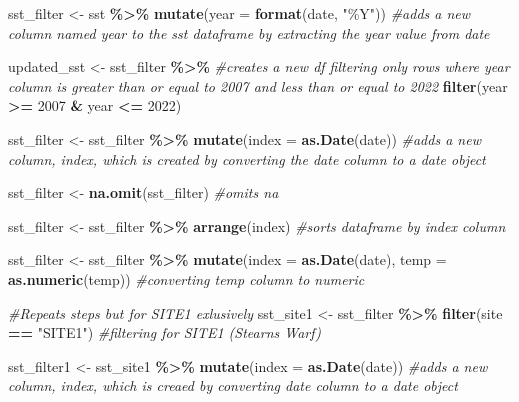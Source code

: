 \documentclass[
]{article}
\newenvironment{Shaded}{\begin{snugshade}}{\end{snugshade}}
\newcommand{\AttributeTok}[1]{\textcolor[rgb]{0.13,0.29,0.53}{#1}}
\newcommand{\CommentTok}[1]{\textcolor[rgb]{0.56,0.35,0.01}{\textit{#1}}}
\newcommand{\DecValTok}[1]{\textcolor[rgb]{0.00,0.00,0.81}{#1}}
\newcommand{\FunctionTok}[1]{\textcolor[rgb]{0.13,0.29,0.53}{\textbf{#1}}}
\newcommand{\NormalTok}[1]{#1}
\newcommand{\OtherTok}[1]{\textcolor[rgb]{0.56,0.35,0.01}{#1}}
\newcommand{\SpecialCharTok}[1]{\textcolor[rgb]{0.81,0.36,0.00}{\textbf{#1}}}
\newcommand{\StringTok}[1]{\textcolor[rgb]{0.31,0.60,0.02}{#1}}
\begin{document}
\begin{Shaded}
\begin{Highlighting}[]
\NormalTok{sst\_filter }\OtherTok{\textless{}{-}}\NormalTok{ sst }\SpecialCharTok{\%\textgreater{}\%}
  \FunctionTok{mutate}\NormalTok{(}\AttributeTok{year =} \FunctionTok{format}\NormalTok{(date, }\StringTok{"\%Y"}\NormalTok{)) }\CommentTok{\#adds a new column named year to the sst dataframe by extracting the year value from date }

\NormalTok{updated\_sst }\OtherTok{\textless{}{-}}\NormalTok{ sst\_filter }\SpecialCharTok{\%\textgreater{}\%} \CommentTok{\#creates a new df filtering only rows where year column is greater than or equal to 2007 and less than or equal to 2022}
  \FunctionTok{filter}\NormalTok{(year }\SpecialCharTok{\textgreater{}=} \DecValTok{2007} \SpecialCharTok{\&}\NormalTok{ year }\SpecialCharTok{\textless{}=} \DecValTok{2022}\NormalTok{)}

\NormalTok{sst\_filter }\OtherTok{\textless{}{-}}\NormalTok{ sst\_filter }\SpecialCharTok{\%\textgreater{}\%}
  \FunctionTok{mutate}\NormalTok{(}\AttributeTok{index =} \FunctionTok{as.Date}\NormalTok{(date)) }\CommentTok{\#adds a new column, index, which is created by converting the date column to a date object}

\NormalTok{sst\_filter }\OtherTok{\textless{}{-}} \FunctionTok{na.omit}\NormalTok{(sst\_filter) }\CommentTok{\#omits na}

\NormalTok{sst\_filter }\OtherTok{\textless{}{-}}\NormalTok{ sst\_filter }\SpecialCharTok{\%\textgreater{}\%}
  \FunctionTok{arrange}\NormalTok{(index) }\CommentTok{\#sorts dataframe by index column}

\NormalTok{sst\_filter }\OtherTok{\textless{}{-}}\NormalTok{ sst\_filter }\SpecialCharTok{\%\textgreater{}\%}
  \FunctionTok{mutate}\NormalTok{(}\AttributeTok{index =} \FunctionTok{as.Date}\NormalTok{(date),}
         \AttributeTok{temp =} \FunctionTok{as.numeric}\NormalTok{(temp)) }\CommentTok{\#converting temp column to numeric}

\CommentTok{\#Repeats steps but for SITE1 exlusively }
\NormalTok{sst\_site1 }\OtherTok{\textless{}{-}}\NormalTok{ sst\_filter }\SpecialCharTok{\%\textgreater{}\%}
  \FunctionTok{filter}\NormalTok{(site }\SpecialCharTok{==} \StringTok{"SITE1"}\NormalTok{) }\CommentTok{\#filtering for SITE1 (Stearns Warf)}

\NormalTok{sst\_filter1 }\OtherTok{\textless{}{-}}\NormalTok{ sst\_site1 }\SpecialCharTok{\%\textgreater{}\%}
  \FunctionTok{mutate}\NormalTok{(}\AttributeTok{index =} \FunctionTok{as.Date}\NormalTok{(date))  }\CommentTok{\#adds a new column, index, which is creaed by converting date column to a date object}


\end{Highlighting}
\end{Shaded}
\end{document}
